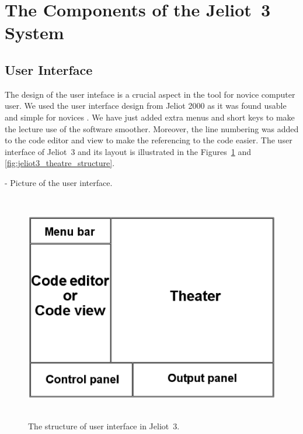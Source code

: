 \section{The Components of the Jeliot~3 System}
\label{sec:The_Components_of_the_Jeliot_3_System}


\subsection{User Interface}
\label{sec:User_Interface}

The design of the user inteface is a crucial aspect in the tool for novice computer user.
We used the user interface design from Jeliot 2000 as it was found usable and simple for novices \citep{Levy2003}.
We have just added extra menus and short keys to make the lecture use of
the software smoother. Moreover, the line numbering was added to the code editor and view to
make the referencing to the code easier. The user interface of Jeliot~3 and its layout is
illustrated in the Figures~\ref{fig:jeliot3_UI_structure} and \ref{fig:jeliot3_theatre_structure}.

- Picture of the user interface.

\begin{figure}[!htb]
\begin{center}
\includegraphics[height=10cm]{jeliot3_UI_structure.eps}
\caption{The structure of user interface in Jeliot~3.}
\label{fig:jeliot3_UI_structure}
\end{center}
\end{figure}



